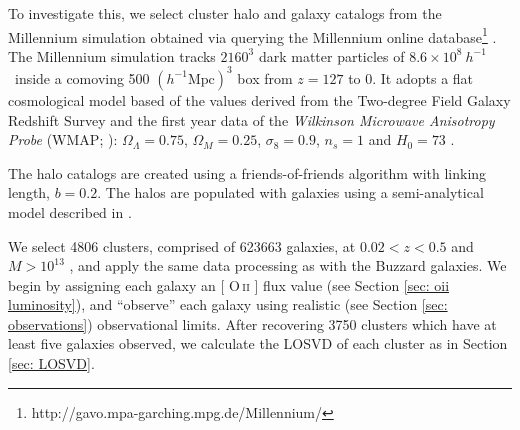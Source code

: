 \documentclass[fleqn,usenatbib]{mnras}
\makeatletter
\DeclareRobustCommand{\ion}[2]{%
\relax\ifmmode
\ifx\testbx\f@series
{\mathbf{#1\,\mathsc{#2}}}\else
{\mathrm{#1\,\mathsc{#2}}}\fi
\else\textup{#1\,{\mdseries\textsc{#2}}}%
\fi}
\makeatother
\begin{document}
To investigate this, we select cluster halo and galaxy catalogs from the Millennium simulation \citep{Springel2005a} obtained via querying the Millennium online database\footnote{http://gavo.mpa-garching.mpg.de/Millennium/} \citep{Lemson2006}. The Millennium simulation tracks $2160^3$ dark matter particles of $8.6\times 10^8 ~h^{-1}$ \Msol\ inside a comoving 500 $(h^{-1} \mathrm{Mpc})^3$ box from $z=127$ to 0. It adopts a flat cosmological model based of the values derived from the Two-degree Field Galaxy Redshift Survey \citep{Colless2001} and the first year data of the \emph{Wilkinson Microwave Anisotropy Probe} (WMAP; \citealt{Spergel2003}): $\Omega_\Lambda = 0.75$, $\Omega_M = 0.25$, $\sigma_8 = 0.9$, $n_s = 1$ and $H_0= 73$ \kms \mpc. 

The halo catalogs are created using a friends-of-friends algorithm  with linking length, $b=0.2$. The halos are populated with galaxies using a semi-analytical model described in \cite{Croton2006, DeLucia2006, DeLucia2007a}. 

We select 4806 clusters, comprised of 623663 galaxies, at $0.02 < z < 0.5$ and $M > 10^{13}$ \Msol, and apply the same data processing as with the Buzzard galaxies. We begin by assigning each galaxy an [\ion{O}{ii}] flux value (see Section \ref{sec: oii luminosity}), and ``observe'' each galaxy using realistic (see Section \ref{sec: observations}) observational limits. After recovering 3750 clusters which have at least five galaxies observed, we calculate the LOSVD of each cluster as in Section \ref{sec: LOSVD}. 
\end{document}

